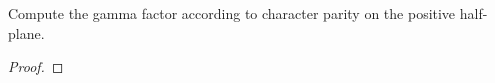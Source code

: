 \begin{theorem}
\label{vGamma}
\leanok
Compute the gamma factor according to character parity on the positive half-plane.
\end{theorem}
\begin{proof}
\leanok
\end{proof}
